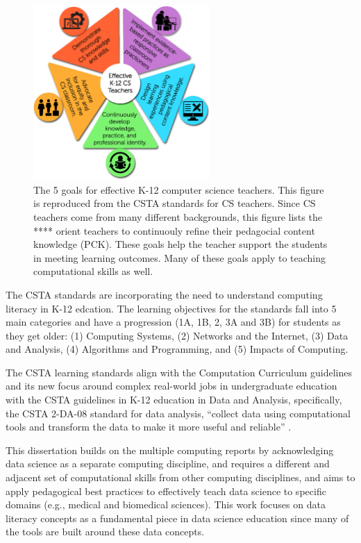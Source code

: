 \documentclass[010-intro.tex]{subfiles}
\begin{document}
    \begin{figure}[htb]
        \centering
        \includegraphics[width=0.6\textwidth]{figs/050-intro/CSTA-Standards-for-CS-Teachers---Main-Graphic.png}
        \caption[CSTA Standards for CS Teachers]{
            The 5 goals for effective K-12 computer science teachers.
            This figure is reproduced from the CSTA standards for CS teachers.
            Since CS teachers come from many different backgrounds,
            this figure lists the **** orient teachers to continuouly refine their pedagocial content knowledge (PCK).
            These goals help the teacher support the students in meeting learning outcomes.
            Many of these goals apply to teaching computational skills as well.
        }
        \label{fig:csta-teaching-standards}
    \end{figure}

    The CSTA standards are incorporating the need to understand computing literacy in K-12 edcation.
    The learning objectives for the standards fall into 5 main categories and have a progression (1A, 1B, 2, 3A and 3B)
    for students as they get older:
    (1) Computing Systems,
    (2) Networks and the Internet,
    (3) Data and Analysis,
    (4) Algorithms and Programming, and
    (5) Impacts of Computing.

    The CSTA learning standards align with the Computation Curriculum guidelines
    and its new focus around complex real-world jobs in undergraduate education with
    the CSTA guidelines in K-12 education in Data and Analysis,
    specifically,
    the CSTA 2-DA-08 standard for data analysis,
    ``collect data using computational tools and transform the data to make it more useful and reliable''
    \cite{csta, csta2017, cc2020}.

    This dissertation builds on the multiple computing reports by acknowledging data science as a separate computing discipline,
    and requires a different and adjacent set of computational skills
    from other computing disciplines,
    and aims to apply pedagogical best practices to effectively teach data science to specific domains (e.g., medical and biomedical sciences).
    This work focuses on data literacy concepts as a fundamental piece in data science
    education since many of the tools are built around these data concepts.
\end{document}
